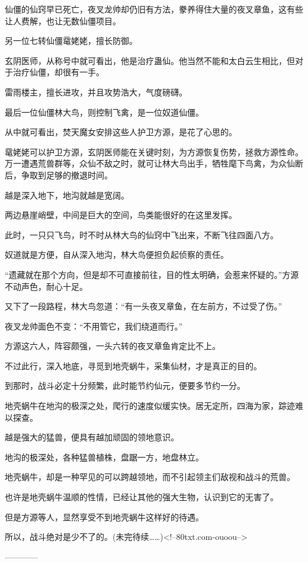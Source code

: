 \begin{this_body}
仙僵的仙窍早已死亡，夜叉龙帅却仍旧有方法，豢养得住大量的夜叉章鱼，这有些让人费解，也让无数仙僵项目。

另一位七转仙僵鼋姥姥，擅长防御。

玄阴医师，从称号中就可看出，他是治疗蛊仙。他当然不能和太白云生相比，但对于治疗仙僵，却很有一手。

雷雨楼主，擅长进攻，并且攻势浩大，气度磅礴。

最后一位仙僵林大鸟，则控制飞禽，是一位奴道仙僵。

从中就可看出，焚天魔女安排这些人护卫方源，是花了心思的。

鼋姥姥可以护卫方源，玄阴医师能在关键时刻，为方源恢复伤势，拯救方源性命。万一遭遇荒兽群等，众仙不敌之时，就可让林大鸟出手，牺牲麾下鸟禽，为众仙断后，争取到足够的撤退时间。

越是深入地下，地沟就越是宽阔。

两边悬崖峭壁，中间是巨大的空间，鸟类能很好的在这里发挥。

此时，一只只飞鸟，时不时从林大鸟的仙窍中飞出来，不断飞往四面八方。

奴道就是方便，自从深入地沟，林大鸟便担负起侦察的责任。

“遗藏就在那个方向，但是却不可直接前往，目的性太明确，会惹来怀疑的。”方源不动声色，耐心十足。

又下了一段路程，林大鸟忽道：“有一头夜叉章鱼，在左前方，不过受了伤。”

夜叉龙帅面色不变：“不用管它，我们绕道而行。”

方源这六人，阵容颇强，一头六转的夜叉章鱼肯定比不上。

不过此行，深入地底，寻觅到地壳蜗牛，采集仙材，才是真正的目的。

到那时，战斗必定十分频繁，此时能节约仙元，便要多节约一分。

地壳蜗牛在地沟的极深之处，爬行的速度似缓实快。居无定所，四海为家，踪迹难以探查。

越是强大的猛兽，便具有越加顽固的领地意识。

地沟的极深处，各种猛兽植株，盘踞一方，地盘林立。

地壳蜗牛，却是一种罕见的可以跨越领地，而不引起领主们敌视和战斗的荒兽。

也许是地壳蜗牛温顺的性情，已经让其他的强大生物，认识到它的无害了。

但是方源等人，显然享受不到地壳蜗牛这样好的待遇。

所以，战斗绝对是少不了的。(未完待续……)<!--80txt.com-ouoou-->

------------

\end{this_body}

